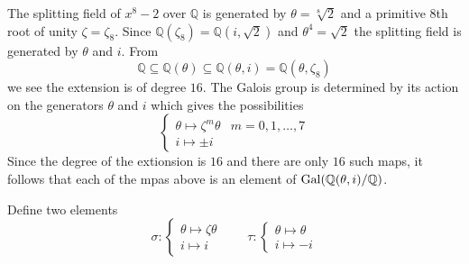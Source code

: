 \documentclass[a4paper]{article}
\begin{document}
\begin{eg}
  The splitting field of $x^8 - 2$ over $\mathbb{Q}$ is generated by $\theta = \sqrt[8] 2$ and a primitive $8$th root of unity $\zeta = \zeta_8$. Since $\mathbb{Q}(\zeta_8) = \mathbb{Q}(i, \sqrt 2)$ and $\theta^4 = \sqrt 2$ the splitting field is generated by $\theta$ and $i$. From
  \[ \mathbb{Q} \subseteq \mathbb{Q}(\theta) \subseteq \mathbb{Q}(\theta, i) = \mathbb{Q}(\theta, \zeta_8) \]
  we see the extension is of degree $16$. The Galois group is determined by its action on the generators $\theta$ and $i$ which gives the possibilities
  \[
    \begin{cases}
      \theta \mapsto \zeta^m \theta & m = 0, 1, \ldots, 7 \\
      i \mapsto \pm i
    \end{cases}
  \]
  Since the degree of the extionsion is $16$ and there are only $16$ such maps, it follows that each of the mpas above is an element of $\gal(\mathbb{Q}(\theta, i)/\mathbb{Q})$.

  Define two elements
  \[
    \sigma:
    \begin{cases}
      \theta \mapsto \zeta\theta \\
      i \mapsto i
    \end{cases}
    \qquad
    \tau:
    \begin{cases}
      \theta \mapsto \theta \\
      i \mapsto -i
    \end{cases}
  \]


\end{eg}
\end{document}
